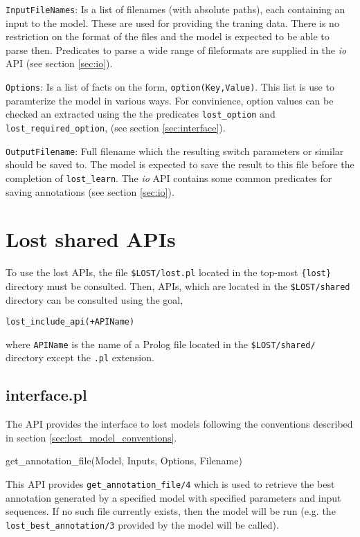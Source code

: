 \documentclass{book}
\begin{document}
\texttt{InputFileNames}: Is a list of filenames (with absolute paths),
each containing an input to the model. These are used for providing 
the traning data. There is no restriction on the format of the files 
and the model is expected to be able to parse then. Predicates to
parse a wide range of fileformats are supplied in
 the \emph{io} API (see section \ref{sec:io}). 

\texttt{Options}: Is a list of facts on the form,
\texttt{option(Key,Value)}. This list is use to paramterize the model
in various ways. For convinience, option values can be checked an
extracted using the the predicates \texttt{lost\_option} and
\texttt{lost\_required\_option}, (see section \ref{sec:interface}).

\texttt{OutputFilename}: Full filename which the resulting switch
parameters or similar should be saved to. The model is expected to save
the result to this file before the completion of 
\texttt{lost\_learn}. The \emph{io} API contains some
common predicates for saving annotations (see section \ref{sec:io}).

\chapter{Lost shared APIs}

To use the lost APIs, the file \texttt{\$LOST/lost.pl} located in the
top-most \texttt{\{lost\}} directory must be consulted. Then,
APIs, which are located in the \texttt{\$LOST/shared} directory
can be consulted using the goal, 
\begin{verbatim}
lost_include_api(+APIName)
\end{verbatim}

\noindent
where \texttt{APIName} is the name of a Prolog file located
in the \texttt{\$LOST/shared/} directory except the \texttt{.pl}
extension.

\section{interface.pl}

The API provides the interface to lost models following the
conventions described in section \ref{sec:lost_model_conventions}.

get\_annotation\_file(Model, Inputs, Options, Filename)

This API provides \texttt{get\_annotation\_file/4} which is used to
retrieve the best annotation generated by a specified model with
specified parameters and input sequences. If no such file currently
exists, then the model will be run (e.g. the
\texttt{lost\_best\_annotation/3} provided by the model will be
called).
\end{document}
